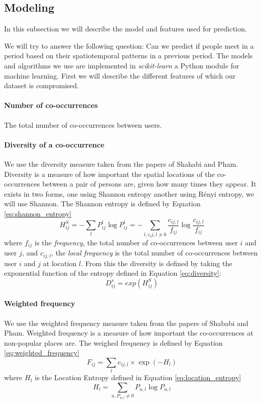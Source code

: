 \subsection{Modeling}
In this subsection we will describe the model and features used for prediction.

We will try to answer the following question: Can we predict if people meet in a period based on their spatiotemporal patterns in a previous period.
The models and algorithms we use are implemented in \textit{scikit-learn}\cite{scikit-learn} a Python module for machine learning. 
First we will describe the different features of which our dataset is compromised.
\paragraph{Number of co-occurrences}
The total number of co-occurrences between users.
\paragraph{Diversity of a co-occurrence}
We use the diversity measure taken from the papers of Shahabi and Pham\cite{iRWRfSD}\cite{AEBMtISSfSD}.
Diversity is a measure of how important the spatial locations of the co-occurrences between a pair of persons are, given how many times they appear.
It exists in two forms, one using Shannon entropy another using Rényi entropy, we will use Shannon.
The Shannon entropy is defined by Equation \ref{eq:shannon_entropy}
\begin{equation}
\label{eq:shannon_entropy}
H^S_{ij}=-\sum\limits_{l}P^l_{ij} \log P^l_{ij}= -\sum\limits_{l,c_ij,l\neq 0}\frac{c_{ij,l}}{f_{ij}}\log \frac{c_{ij,l}}{f_{ij}}
\end{equation}
where $f_{ij}$ is the \textit{frequency}, the total number of co-occurrences between user $i$ and user $j$, and $c_{ij,l}$, the \textit{local frequency} is the total number of co-occurrences between user $i$ and $j$ at location $l$.
From this the diversity is defined by taking the exponential function of the entropy defined in Equation \ref{eq:diversity}:
\begin{equation}
\label{eq:diversity}
D^s_{ij} = exp(H^S_{ij})
\end{equation}

\paragraph{Weighted frequency}
We use the weighted frequency measure taken from the papers of Shababi and Pham\cite{iRWRfSD}\cite{AEBMtISSfSD}.
Weighted frequency is a measure of how important the co-occurrences at non-popular places are.
The weighed frequency is defined by Equation \ref{eq:weighted_frequency}
\begin{equation}
\label{eq:weighted_frequency}
F_{ij}=\sum\limits_{l}c_{ij,l} \times \exp(-H_l)
\end{equation}
where $H_l$ is the Location Entropy defined in Equation \ref{eq:location_entropy}
\begin{equation}
\label{eq:location_entropy}
H_l = \sum\limits_{u, P_{u,l}\neq0} P_{u,l}\log P_{u,l}
\end{equation}

